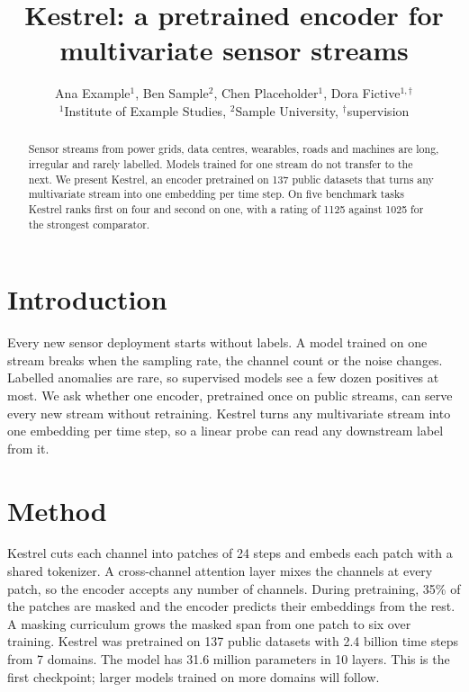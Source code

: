 \documentclass{article}
\title{Kestrel: a pretrained encoder for multivariate sensor streams}
\author{Ana Example$^{1}$, Ben Sample$^{2}$, Chen Placeholder$^{1}$, Dora Fictive$^{1,\dagger}$\\
$^{1}$Institute of Example Studies, $^{2}$Sample University, $^{\dagger}$supervision}
\begin{document}
\maketitle

\begin{abstract}
Sensor streams from power grids, data centres, wearables, roads and machines are long, irregular and rarely labelled.
Models trained for one stream do not transfer to the next.
We present Kestrel, an encoder pretrained on 137 public datasets that turns any multivariate stream into one embedding per time step.
On five benchmark tasks Kestrel ranks first on four and second on one, with a rating of 1125 against 1025 for the strongest comparator.
\end{abstract}

\section{Introduction}
Every new sensor deployment starts without labels.
A model trained on one stream breaks when the sampling rate, the channel count or the noise changes.
Labelled anomalies are rare, so supervised models see a few dozen positives at most.
We ask whether one encoder, pretrained once on public streams, can serve every new stream without retraining.
Kestrel turns any multivariate stream into one embedding per time step, so a linear probe can read any downstream label from it.

\section{Method}
Kestrel cuts each channel into patches of 24 steps and embeds each patch with a shared tokenizer.
A cross-channel attention layer mixes the channels at every patch, so the encoder accepts any number of channels.
During pretraining, 35\% of the patches are masked and the encoder predicts their embeddings from the rest.
A masking curriculum grows the masked span from one patch to six over training.
Kestrel was pretrained on 137 public datasets with 2.4 billion time steps from 7 domains.
The model has 31.6 million parameters in 10 layers.
This is the first checkpoint; larger models trained on more domains will follow.
\end{document}
